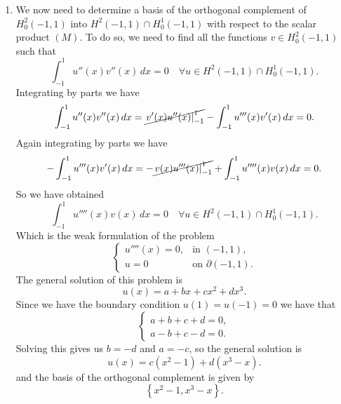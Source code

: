 \begin{enumerate}
    \item We now need to determine a basis of the orthogonal complement of \(H^2_0(-1, 1)\) into \(H^2(-1, 1)\cap H^1_0(-1, 1)\) with respect to the scalar product \((M)\). 
    To do so, we need to find all the functions \(v \in H^2_0(-1, 1)\) such that
    \[
        \int_{-1}^1 u''(x) v''(x) \, dx = 0 \quad \forall u \in H^2(-1, 1)\cap H^1_0(-1, 1).
    \]
    Integrating by parts we have
    \[
        \int_{-1}^1 u''(x) v''(x) \, dx = \cancel{\left. v'(x) u''(x) \right|_{-1}^1} - \int_{-1}^1 u'''(x) v'(x) \, dx = 0.
    \]
    Again integrating by parts we have
    \[
        -\int_{-1}^1 u'''(x) v'(x) \, dx = -\cancel{\left. v(x) u'''(x) \right|_{-1}^1} + \int_{-1}^1 u''''(x) v(x) \, dx = 0. 
    \]
    So we have obtained 
    \[
        \int_{-1}^1 u''''(x) v(x) \, dx = 0 \quad \forall u \in H^2(-1, 1)\cap H^1_0(-1, 1).
    \]
    Which is the weak formulation of the problem
    \[
        \begin{cases}
            u''''(x) = 0, & \text{in } (-1, 1), \\
            u = 0 & \text{on } \partial (-1, 1).
        \end{cases}
    \]
    The general solution of this problem is
    \[
        u(x) = a + bx + cx^2 + d x^3.
    \]
    Since we have the boundary condition \(u(1) = u(-1) = 0\) we have that 
    \[
        \begin{cases}
            a + b + c + d = 0, \\
            a - b + c - d = 0.
        \end{cases}
    \]
    Solving this gives us \(b = -d\) and \(a = -c\), so the general solution is
    \[
        u(x) = c(x^2 - 1) + d(x^3 - x).
    \]
    and the basis of the orthogonal complement is given by
    \[
        \left\{ x^2 - 1, x^3 - x \right\}.
    \]
\end{enumerate}


